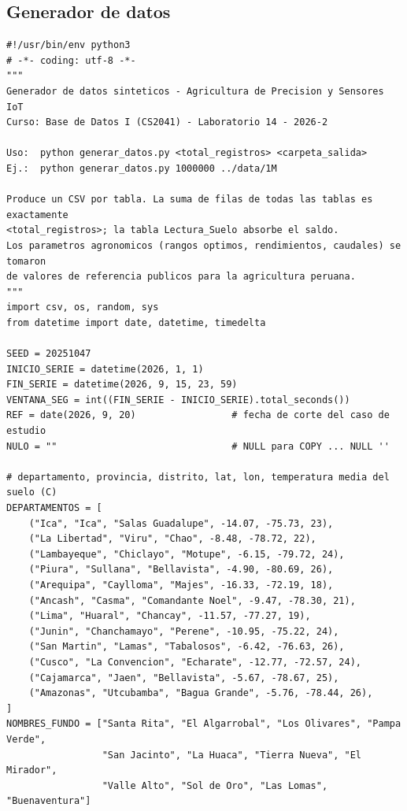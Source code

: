 \documentclass[11pt,letterpaper]{article}
\begin{document}
\subsection{Generador de datos}
\label{sec:generador}

\begin{lstlisting}[style=py]
#!/usr/bin/env python3
# -*- coding: utf-8 -*-
"""
Generador de datos sinteticos - Agricultura de Precision y Sensores IoT
Curso: Base de Datos I (CS2041) - Laboratorio 14 - 2026-2

Uso:  python generar_datos.py <total_registros> <carpeta_salida>
Ej.:  python generar_datos.py 1000000 ../data/1M

Produce un CSV por tabla. La suma de filas de todas las tablas es exactamente
<total_registros>; la tabla Lectura_Suelo absorbe el saldo.
Los parametros agronomicos (rangos optimos, rendimientos, caudales) se tomaron
de valores de referencia publicos para la agricultura peruana.
"""
import csv, os, random, sys
from datetime import date, datetime, timedelta

SEED = 20251047
INICIO_SERIE = datetime(2026, 1, 1)
FIN_SERIE = datetime(2026, 9, 15, 23, 59)
VENTANA_SEG = int((FIN_SERIE - INICIO_SERIE).total_seconds())
REF = date(2026, 9, 20)                 # fecha de corte del caso de estudio
NULO = ""                               # NULL para COPY ... NULL ''

# departamento, provincia, distrito, lat, lon, temperatura media del suelo (C)
DEPARTAMENTOS = [
    ("Ica", "Ica", "Salas Guadalupe", -14.07, -75.73, 23),
    ("La Libertad", "Viru", "Chao", -8.48, -78.72, 22),
    ("Lambayeque", "Chiclayo", "Motupe", -6.15, -79.72, 24),
    ("Piura", "Sullana", "Bellavista", -4.90, -80.69, 26),
    ("Arequipa", "Caylloma", "Majes", -16.33, -72.19, 18),
    ("Ancash", "Casma", "Comandante Noel", -9.47, -78.30, 21),
    ("Lima", "Huaral", "Chancay", -11.57, -77.27, 19),
    ("Junin", "Chanchamayo", "Perene", -10.95, -75.22, 24),
    ("San Martin", "Lamas", "Tabalosos", -6.42, -76.63, 26),
    ("Cusco", "La Convencion", "Echarate", -12.77, -72.57, 24),
    ("Cajamarca", "Jaen", "Bellavista", -5.67, -78.67, 25),
    ("Amazonas", "Utcubamba", "Bagua Grande", -5.76, -78.44, 26),
]
NOMBRES_FUNDO = ["Santa Rita", "El Algarrobal", "Los Olivares", "Pampa Verde",
                 "San Jacinto", "La Huaca", "Tierra Nueva", "El Mirador",
                 "Valle Alto", "Sol de Oro", "Las Lomas", "Buenaventura"]


\end{lstlisting}
\end{document}
